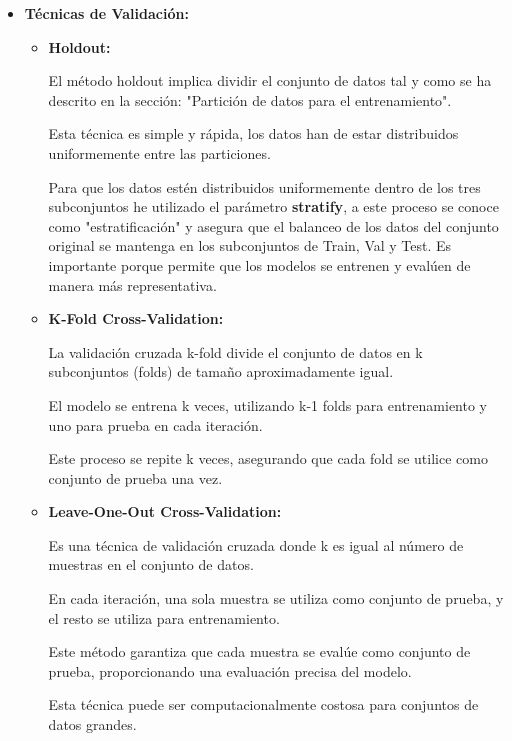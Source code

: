 \begin{itemize}

\item
\textbf{Técnicas de Validación:}

	\begin{itemize}
	
	\item
	\textbf{Holdout:}
	
	El método holdout implica dividir el conjunto de datos tal y como se ha descrito en la sección: "Partición de datos para el entrenamiento".
	
	
	Esta técnica es simple y rápida, los datos han de estar distribuidos uniformemente entre las particiones.
	
	Para que los datos estén distribuidos uniformemente dentro de los tres subconjuntos he utilizado el parámetro \textbf{stratify}, a este proceso se conoce como "estratificación" y asegura que el balanceo de los datos del conjunto original se mantenga en los subconjuntos de Train, Val y Test. Es importante porque permite que los modelos se entrenen y evalúen de manera más representativa.
	
	

	\item
	\textbf{K-Fold Cross-Validation:}
	
	
	La validación cruzada k-fold divide el conjunto de datos en k subconjuntos (folds) de tamaño aproximadamente igual.
	
	El modelo se entrena k veces, utilizando k-1 folds para entrenamiento y uno para prueba en cada iteración.
	
	Este proceso se repite k veces, asegurando que cada fold se utilice como conjunto de prueba una vez.
	
	\item
	\textbf{Leave-One-Out Cross-Validation:}
	
	Es una técnica de validación cruzada donde k es igual al número de muestras en el conjunto de datos.
	
	En cada iteración, una sola muestra se utiliza como conjunto de prueba, y el resto se utiliza para entrenamiento.
	
	Este método garantiza que cada muestra se evalúe como conjunto de prueba, proporcionando una evaluación precisa del modelo.
	
	Esta técnica puede ser computacionalmente costosa para conjuntos de datos grandes.
		
	\end{itemize}
	

\end{itemize}
